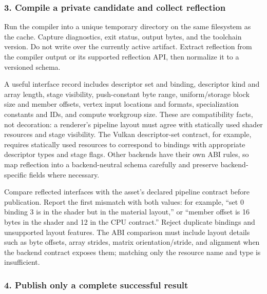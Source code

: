 \subsubsection{3. Compile a private candidate and collect reflection}\label{05-engine-i-ch010-compile-a-private-candidate-and-collect-reflection}

\hypertarget{05-engine-i-ch010-compile-a-private-candidate-and-collect-reflection}{}

Run the compiler into a unique temporary directory on the same filesystem as the cache. Capture diagnostics, exit status, output bytes, and the toolchain version. Do not write over the currently active artifact. Extract reflection from the compiler output or its supported reflection API, then normalize it to a versioned schema.

A useful interface record includes descriptor set and binding, descriptor kind and array length, stage visibility, push-constant byte range, uniform/storage block size and member offsets, vertex input locations and formats, specialization constants and IDs, and compute workgroup size. These are compatibility facts, not decoration: a renderer's pipeline layout must agree with statically used shader resources and stage visibility. The Vulkan descriptor-set contract, for example, requires statically used resources to correspond to bindings with appropriate descriptor types and stage flags. Other backends have their own ABI rules, so map reflection into a backend-neutral schema carefully and preserve backend-specific fields where necessary.

Compare reflected interfaces with the asset's declared pipeline contract before publication. Report the first mismatch with both values: for example, ``set 0 binding 3 is  in the shader but  in the material layout,'' or ``member  offset is 16 bytes in the shader and 12 in the CPU contract.'' Reject duplicate bindings and unsupported layout features. The ABI comparison must include layout details such as byte offsets, array strides, matrix orientation/stride, and alignment when the backend contract exposes them; matching only the resource name and type is insufficient.

\subsubsection{4. Publish only a complete successful result}\label{05-engine-i-ch010-publish-only-a-complete-successful-result}

